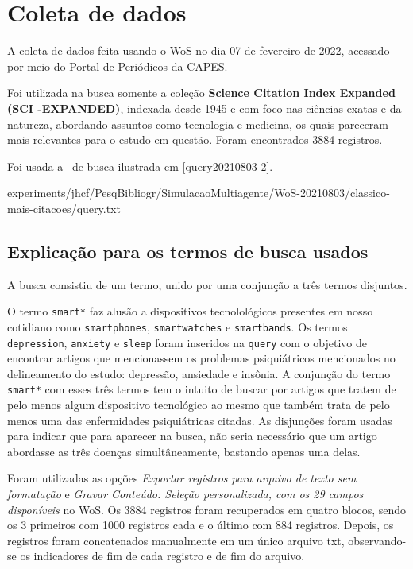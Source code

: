 \section{Coleta de dados}

A coleta de dados feita usando o WoS no dia 07 de fevereiro de 2022, acessado por meio do Portal de Periódicos da CAPES.

Foi utilizada na busca somente a coleção \textbf{Science  Citation  Index  Expanded (SCI -EXPANDED)}, indexada desde 1945 e com foco nas ciências exatas e da natureza, abordando assuntos como tecnologia e medicina, 
os quais pareceram mais relevantes para o estudo em questão. Foram encontrados 3884 registros.

Foi usada a \query\  de busca ilustrada em \ref{query20210803-2}.


{experiments/jhcf/PesqBibliogr/SimulacaoMultiagente/WoS-20210803/classico-mais-citacoes/query.txt}

\subsection{Explicação para os termos de busca usados}

A busca consistiu de um termo, unido por uma conjunção a três termos disjuntos.

O termo \texttt{smart*} faz alusão a dispositivos tecnolológicos presentes em nosso cotidiano como \texttt{smartphones}, \texttt{smartwatches} e \texttt{smartbands}. Os termos \texttt{depression}, \texttt{anxiety} e \texttt{sleep} foram 
inseridos na \texttt{query} com o objetivo de encontrar artigos que mencionassem os problemas psiquiátricos mencionados no delineamento do estudo: depressão, ansiedade e insônia. A conjunção do termo \texttt{smart*} com esses três termos tem o 
intuito de buscar por artigos que tratem de pelo menos algum dispositivo tecnológico ao mesmo que também trata de pelo menos uma das enfermidades psiquiátricas citadas. As disjunções foram usadas para indicar que para aparecer na busca, não seria 
necessário que um artigo abordasse as três doenças simultâneamente, bastando apenas uma delas.

Foram utilizadas as opções \textit{Exportar registros para arquivo de texto sem formatação} e \textit{Gravar Conteúdo: Seleção personalizada, com os 29 campos disponíveis} no WoS. Os 3884 registros foram recuperados em quatro blocos, sendo os 3 primeiros com 1000 registros cada e o 
último com 884 registros. Depois, os registros foram concatenados manualmente em um único arquivo txt, observando-se os indicadores de fim de cada registro e de fim do arquivo. 

